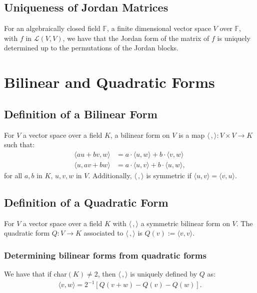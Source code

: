 \documentclass[a4paper, 12pt, twoside]{article}
\begin{document}
\subsection{Uniqueness of Jordan Matrices}

For an algebraically closed field $\mathbb{F}$, a finite dimensional vector space $V$ over
$\mathbb{F}$, with $f$ in $\mathcal{L}(V, V)$, we have that the Jordan form of the 
matrix of $f$ is uniquely determined up to the permutations of the Jordan blocks.

\section{Bilinear and Quadratic Forms}

\subsection{Definition of a Bilinear Form}

For $V$ a vector space over a field $K$, a bilinear form on $V$ is a map $\langle\,,\rangle : V \times V \to K$
such that: \begin{align*}
  \langle au + bv, w \rangle &= a \cdot \langle u, w \rangle + b \cdot \langle v, w \rangle \\
  \langle u, av + bw \rangle &= a \cdot \langle u, v \rangle + b \cdot \langle u, w \rangle,
\end{align*} for all $a, b$ in $K$, $u, v, w$ in $V$. Additionally, $\langle\,,\rangle$ is symmetric if 
$\langle u, v \rangle = \langle v, u \rangle$.

\subsection{Definition of a Quadratic Form}

For $V$ a vector space over a field $K$ with $\langle \, , \rangle$ a symmetric bilinear form on
$V$. The quadratic form $Q : V \to K$ associated to $\langle \, , \rangle$ is 
$Q(v) := \langle v, v \rangle$.

\subsubsection{Determining bilinear forms from quadratic forms}

We have that if char$(K) \neq 2$, then $\langle \, , \rangle$ is uniquely defined by $Q$ as:
\begin{gather*}
  \langle v, w \rangle = 2^{-1}\left[Q(v + w) - Q(v) - Q(w) \right]. 
\end{gather*} 
\end{document}
